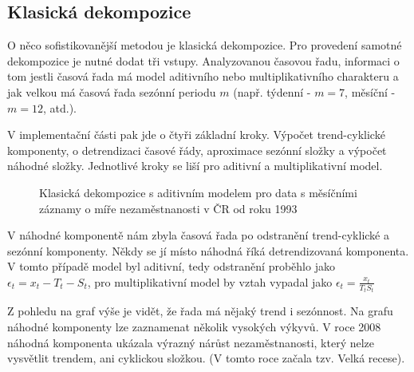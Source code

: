 \documentclass[FM,BP,fonts]{tulthesis}
\begin{document}
\subsection{Klasická dekompozice}
O něco sofistikovanější metodou je klasická dekompozice. Pro provedení samotné dekompozice je nutné dodat tři vstupy. Analyzovanou časovou řadu, informaci o tom jestli časová řada má model aditivního nebo multiplikativního charakteru a jak velkou má časová řada sezónní periodu $m$ (např. týdenní - $m=7$, měsíční - $m=12$, atd.).

V implementační části pak jde o čtyři základní kroky. Výpočet trend-cyklické komponenty, o detrendizaci časové řády, aproximace sezónní složky a výpočet náhodné složky. Jednotlivé kroky se liší pro aditivní a multiplikativní model. 
 
\begin{figure}[htbp]
	\centering
	\caption{Klasická dekompozice s aditivním modelem pro data s měsíčními záznamy o míře nezaměstnanosti v ČR od roku 1993 }
	\label{fig:my_graph}
\end{figure}

V náhodné komponentě nám zbyla časová řada po odstranění trend-cyklické a sezónní komponenty. Někdy se jí místo náhodná říká detrendizovaná komponenta. V tomto případě model byl aditivní, tedy odstranění proběhlo jako $\epsilon_t = x_t - T_t - S_t$, pro multiplikativní model by vztah vypadal jako $\epsilon_t = \frac{x_t}{T_tS_t}$

Z pohledu na graf výše je vidět, že řada má nějaký trend i sezónnost. Na grafu náhodné komponenty lze zaznamenat několik vysokých výkyvů. V roce 2008 náhodná komponenta ukázala výrazný nárůst nezaměstnanosti, který nelze vysvětlit trendem, ani cyklickou složkou. (V tomto roce začala tzv. Velká recese).
\end{document}
